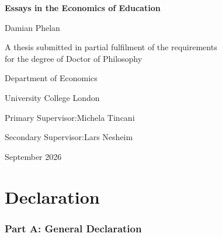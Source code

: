 \documentclass[12pt, a4paper]{report}
\begin{document}
\begin{titlepage}
  \centering
  \vspace*{1.5cm}
  {\LARGE\bfseries Essays in the Economics of Education\par}
  \vspace{2cm}
  {\large Damian Phelan\par}
  \vspace{2cm}
  {\normalsize
    A thesis submitted in partial fulfilment of the requirements\\[0.4em]
    for the degree of Doctor of Philosophy\par
  }
  \vspace{1.5cm}
  {\normalsize Department of Economics\par}
  \vspace{0.3cm}
  {\normalsize University College London\par}
  \vspace{2cm}
  {\normalsize Primary Supervisor:\enspace Michela Tincani\par}
  \vspace{0.4cm}
  {\normalsize Secondary Supervisor:\enspace Lars Nesheim\par}
  \vspace{2cm}
  {\normalsize September 2026\par}
\end{titlepage}

\setcounter{page}{2}

\chapter*{Declaration}


\subsection*{Part A: General Declaration}
\end{document}
